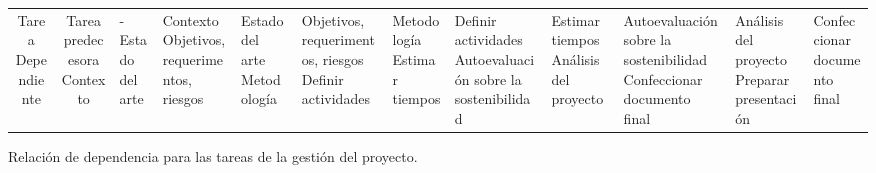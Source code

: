\begin{center}
 \begin{tabular}{||c c||}
    \hline  
    Tarea Dependiente & Tarea predecesora
    \hline\hline
    Contexto & -
    \hline\hline
    Estado del arte & Contexto
    \hline\hline
    Objetivos, requerimentos, riesgos & Estado del arte
    \hline\hline
    Metodología & Objetivos, requerimentos, riesgos
    \hline\hline
    Definir actividades & Metodología
    \hline\hline
    Estimar tiempos & Definir actividades
    \hline\hline
    Autoevaluación sobre la sostenibilidad & Estimar tiempos
    \hline\hline
    Análisis del proyecto & Autoevaluación sobre la sostenibilidad
    \hline\hline
    Confeccionar documento final & Análisis del proyecto
    \hline\hline
    Preparar presentación & Confeccionar documento final
    \hline\hline
    
    
 \end{tabular}
 \caption{Relación de dependencia para las tareas de la gestión del proyecto.}
\end{center}







